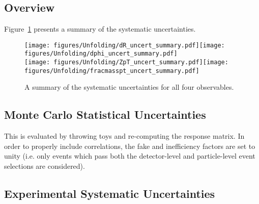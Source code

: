 \subsection{Overview}
\label{sec:systs:overview}

Figure~\ref{fig:syst_overview_deltaR} presents a summary of the systematic uncertainties.

\begin{figure}[htpb!]
\begin{center}
\texttt{[image: figures/Unfolding/dR\_uncert\_summary.pdf]}\texttt{[image: figures/Unfolding/dphi\_uncert\_summary.pdf]}\\
\texttt{[image: figures/Unfolding/ZpT\_uncert\_summary.pdf]}\texttt{[image: figures/Unfolding/fracmasspt\_uncert\_summary.pdf]}
\caption[]{A summary of the systematic uncertainties for all four observables. } 
\label{fig:syst_overview_deltaR}
\end{center}
\end{figure}

\subsection{Monte Carlo Statistical Uncertainties}
\label{sec:systs:MCstat}

This is evaluated by throwing toys and re-computing the response matrix.  In order to properly include correlations, the fake and inefficiency factors are set to unity (i.e. only events which pass both the detector-level and particle-level event selections are considered).

\subsection{Experimental Systematic Uncertainties}
\label{sec:systs:exp}

